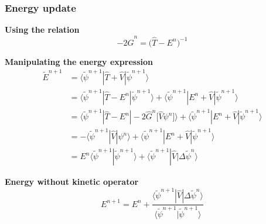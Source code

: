 \begin{frame}
    \frametitle{Energy update}
    \centering
    \textbf{Using the relation}
    \begin{equation}
        \nonumber
        -2\hat{G}^n = \big(\hat{T} - E^n\big)^{-1}
    \end{equation}

    \vspace{5mm}

    \textbf{Manipulating the energy expression}
    \begin{align}
        \tilde{E}^{n+1}
        \nonumber
        &=	\langle\tilde{\psi}^{n+1}| \hat{T}+\hat{V} | \tilde{\psi}^{n+1}\rangle\\
        \nonumber
        &=	\langle\tilde{\psi}^{n+1}|  \hat{T} - E^n  | \tilde{\psi}^{n+1}\rangle
        +	\langle\tilde{\psi}^{n+1}|  E^n + \hat{V}  | \tilde{\psi}^{n+1}\rangle\\
        \nonumber
        &=	\langle\tilde{\psi}^{n+1}|  \hat{T} - E^n  | 
	        -2\hat{G}^n\big[\hat{V}\psi^n\big]\rangle
        +	\langle\tilde{\psi}^{n+1}| E^n + \hat{V} |\tilde{\psi}^{n+1}\rangle\\
        \nonumber
        &= -\langle\tilde{\psi}^{n+1}| \hat{V} |\psi^{n}\rangle
        +	\langle\tilde{\psi}^{n+1}| E^n + \hat{V} |\tilde{\psi}^{n+1}\rangle\\
        \nonumber
        &= E^{n}\langle\tilde{\psi}^{n+1}|\tilde{\psi}^{n+1}\rangle + 
	    \langle\tilde{\psi}^{n+1}| \hat{V} |\Delta\tilde{\psi}^{n}\rangle
    \end{align}

    \vspace{8mm}

    \centering
    \textbf{Energy without kinetic operator}
    \begin{equation}
        \nonumber
        E^{n+1} = E^{n} + 
        \frac{\langle\tilde{\psi}^{n+1}| \hat{V} |\Delta\tilde{\psi}^{n}\rangle}
        {\langle\tilde{\psi}^{n+1}|\tilde{\psi}^{n+1}\rangle}
    \end{equation}
\end{frame}


